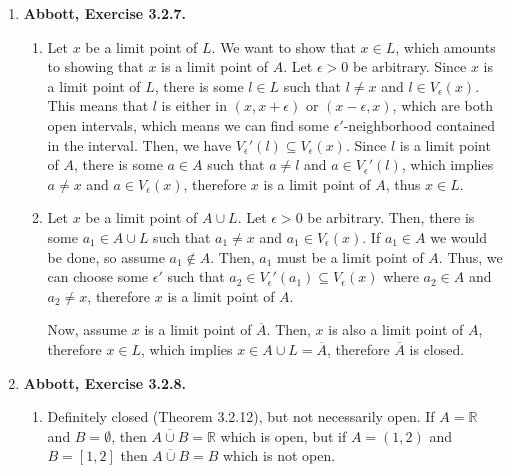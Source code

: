 \documentclass{article}
\newcommand{\N}{\mathbb{N}}
\newcommand{\R}{\mathbb{R}}
\newcommand{\set}[1]{\{#1\}}
\newcommand{\exc}[2][Abbott]{\item \textbf{#1, Exercise #2.}}
\newcommand{\lep}[1][L]{#1et $\epsilon > 0$ be arbitrary}
\begin{document}
\begin{enumerate}
\begin{enumerate}
        \item Define $A := \set{\sqrt{2} + 1/k : k \in \N} \cup \sqrt{2}$. The only limit point of $A$ is $\sqrt{2}$, so $A$ is closed, bounded and infinite but contains no rational numbers.
        
        \item The Cantor set is an intersection of closed sets, so it must be closed, by Theorem 3.2.14.
    \end{enumerate}
    
    \exc{3.2.7}
    \begin{enumerate}
        \item Let $x$ be a limit point of $L$. We want to show that $x \in L$, which amounts to showing that $x$ is a limit point of $A$. \lep. Since $x$ is a limit point of $L$, there is some $l \in L$ such that $l \neq x$ and $l \in V_\epsilon(x)$. This means that $l$ is either in $(x, x+\epsilon)$ or $(x-\epsilon, x)$, which are both open intervals, which means we can find some $\epsilon'$-neighborhood contained in the interval. Then, we have $V_\epsilon'(l) \subseteq V_\epsilon(x)$. Since $l$ is a limit point of $A$, there is some $a \in A$ such that $a \neq l$ and $a \in V_\epsilon'(l)$, which implies $a \neq x$ and $a \in V_\epsilon(x)$, therefore $x$ is a limit point of $A$, thus $x \in L$.
        
        \item Let $x$ be a limit point of $A \cup L$. \lep. Then, there is some $a_1 \in A \cup L$ such that $a_1 \neq x$ and $a_1 \in V_\epsilon(x)$. If $a_1 \in A$ we would be done, so assume $a_1 \notin A$. Then, $a_1$ must be a limit point of $A$. Thus, we can choose some $\epsilon'$ such that $a_2 \in V_\epsilon'(a_1) \subseteq V_\epsilon(x)$ where $a_2 \in A$ and $a_2 \neq x$, therefore $x$ is a limit point of $A$.
        
        Now, assume $x$ is a limit point of  $\overline{A}$. Then, $x$ is also a limit point of $A$, therefore $x \in L$, which implies $x \in A \cup L = \overline{A}$, therefore $\overline{A}$ is closed.
    \end{enumerate}
    
    \exc{3.2.8}
    \begin{enumerate}
        \item Definitely closed (Theorem 3.2.12), but not necessarily open. If $A = \R$ and $B = \emptyset$, then $\overline{A \cup B} = \R$ which is open, but if $A = (1, 2)$ and $B = [1,2]$ then $\overline{A \cup B} = B$ which is not open.
        

\end{enumerate}
\end{enumerate}
\end{document}

